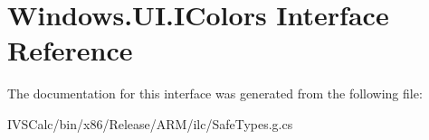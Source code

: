 \hypertarget{interface_windows_1_1_u_i_1_1_i_colors}{}\section{Windows.\+U\+I.\+I\+Colors Interface Reference}
\label{interface_windows_1_1_u_i_1_1_i_colors}


The documentation for this interface was generated from the following file\+:\begin{DoxyCompactItemize}
\item 
I\+V\+S\+Calc/bin/x86/\+Release/\+A\+R\+M/ilc/Safe\+Types.\+g.\+cs\end{DoxyCompactItemize}
